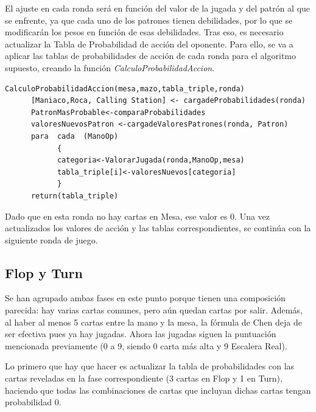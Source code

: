 El ajuste en cada ronda será en función del valor de la jugada y del patrón al que se enfrente, ya que cada uno de los patrones tienen debilidades, por lo que se modificarán los pesos en función de esas debilidades. 
Tras eso, es necesario actualizar la Tabla de Probabilidad de acción del oponente.
Para ello, se va a aplicar las tablas de probabilidades de acción de cada ronda para el algoritmo supuesto, creando la función \textit{CalculoProbabilidadAccion}.

\begin{verbatim}
CalculoProbabilidadAccion(mesa,mazo,tabla_triple,ronda)
      [Maniaco,Roca, Calling Station] <- cargadeProbabilidades(ronda)
      PatronMasProbable<-comparaProbabilidades
      valoresNuevosPatron <-cargadeValoresPatrones(ronda, Patron)
      para  cada  (ManoOp)
            {
            categoria<-ValorarJugada(ronda,ManoOp,mesa)
            tabla_triple[i]<-valoresNuevos[categoria]
            }
      return(tabla_triple)
\end{verbatim}

Dado que en esta ronda no hay cartas en Mesa, ese valor es 0.
Una vez actualizados los valores de acción y las tablas correspondientes, se continúa con la siguiente ronda de juego.

\subsection{Flop y Turn}
\label{sec:flopturn}

Se han agrupado ambas fases en este punto porque tienen una composición parecida: hay varias cartas comunes, pero aún quedan cartas por salir. Además, al haber al menos 5 cartas entre la mano y la mesa, la fórmula de Chen deja de ser efectiva pues ya hay jugadas. Ahora las jugadas siguen la puntuación mencionada previamente (0 a 9, siendo 0 carta más alta y 9 Escalera Real).

Lo primero que hay que hacer es actualizar la tabla de probabilidades con las cartas reveladas en la fase correspondiente (3 cartas en Flop y 1 en Turn), haciendo que todas las combinaciones de cartas que incluyan dichas cartas tengan probabilidad 0.

